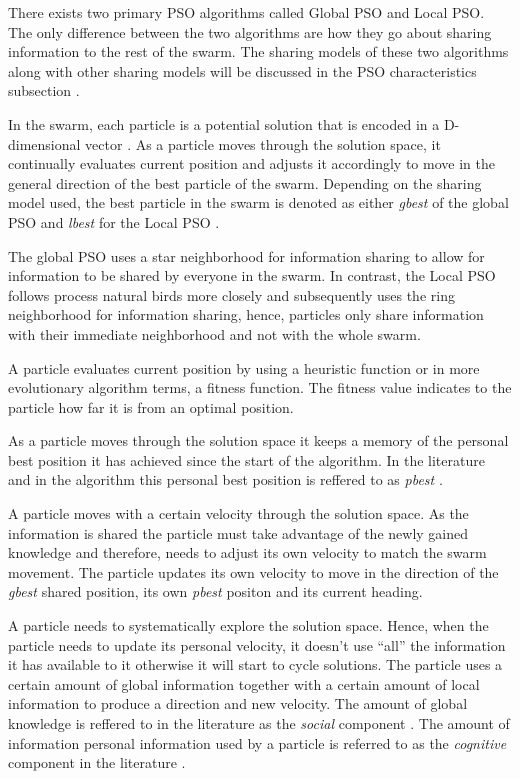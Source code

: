 There exists two primary PSO algorithms called Global PSO and Local PSO. The only difference between the two algorithms are how they go about sharing information to the rest of the swarm. The sharing models of these two algorithms along with other sharing models will be discussed in the PSO characteristics subsection \cite{SOSwarm}.

In the swarm, each particle is a potential solution that is encoded in a D-dimensional vector \cite{PSOHybridJobShop,PSOSelfHierarch}. As a particle moves through the solution space, it continually evaluates current position and adjusts it accordingly to move in the general direction of the best particle of the swarm. Depending on the sharing model used, the best particle in the swarm is denoted as either \emph{gbest} of the global PSO and \emph{lbest} for the Local PSO \cite{SOSwarm,FundamentalSwarm,CompuIntelligenceIntro}. 

The global PSO uses a star neighborhood for information sharing to allow for information to be shared by everyone in the swarm. In contrast, the Local PSO follows process natural birds more closely and subsequently uses the ring neighborhood for information sharing, hence, particles only share information with their immediate neighborhood and not with the whole swarm.

A particle evaluates current position by using a heuristic function or in more evolutionary algorithm terms, a fitness function. The fitness value indicates to the particle how far it is from an optimal position. 

As a particle moves through the solution space it keeps a memory of the personal best position it has achieved since the start of the algorithm. In the literature and in the algorithm this personal best position is reffered to as \emph{pbest} \cite{SOSwarm}.

A particle moves with a certain velocity through the solution space. As the information is shared the particle must take advantage of the newly gained knowledge and therefore, needs to adjust its own velocity to match the swarm movement. The particle updates its own velocity to move in the direction of the \emph{gbest} shared position, its own \emph{pbest} positon and its current heading.

A particle needs to systematically explore the solution space. Hence, when the particle needs to update its personal velocity, it doesn't use ``all'' the information it has available to it otherwise it will start to cycle solutions. The particle uses a certain amount of global information together with a certain amount of local information to produce a direction and new velocity. The amount of global knowledge is reffered to in the literature as the \emph{social} \label{def:socialcomponent} component \cite{FundamentalSwarm,CompuIntelligenceIntro,PSOSelfHierarch,SOSwarm}. The amount of information personal information used by a particle is referred to as the \emph{cognitive} \label{def:cognitivecomponent} component in the literature \cite{FundamentalSwarm,CompuIntelligenceIntro,PSOSelfHierarch,SOSwarm}.

